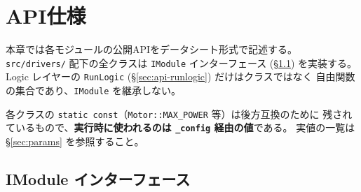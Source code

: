 \documentclass[a4paper,11pt,dvipdfmx]{jsarticle}
\begin{document}
\section{API仕様}\label{sec:api}

本章では各モジュールの公開APIをデータシート形式で記述する。
\texttt{src/drivers/} 配下の全クラスは \texttt{IModule} インターフェース
(\hyperref[sec:api-imodule]{§\ref*{sec:api-imodule}}) を実装する。
Logic レイヤーの \texttt{RunLogic}
(\hyperref[sec:api-runlogic]{§\ref*{sec:api-runlogic}}) だけはクラスではなく
自由関数の集合であり、\texttt{IModule} を継承しない。

\begin{notebox}[定数値の扱い]
各クラスの \texttt{static const}（\texttt{Motor::MAX\_POWER} 等）は後方互換のために
残されているもので、\textbf{実行時に使われるのは \texttt{\_config} 経由の値}である。
実値の一覧は \hyperref[sec:params]{§\ref*{sec:params}} を参照すること。
\end{notebox}

\subsection{IModule インターフェース}\label{sec:api-imodule}
\end{document}
